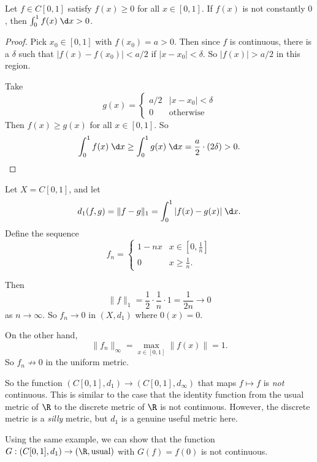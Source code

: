 \documentclass[a4paper]{article}
\begin{document}
\begin{lemma}
  Let $f\in C[0, 1]$ satisfy $f(x) \geq 0$ for all $x\in [0, 1]$. If $f(x)$ is not constantly $0$, then $\int_0^1 f(x)\;\d x > 0$.
\end{lemma}

\begin{proof}
  Pick $x_0 \in [0, 1]$ with $f(x_0) = a > 0$. Then since $f$ is continuous, there is a $\delta$ such that $|f(x) - f(x_0)| < a/2$ if $|x - x_0| < \delta$. So $|f(x)| > a/2$ in this region.

  Take
  \[
    g(x) =
    \begin{cases}
      a/2 & |x - x_0| < \delta\\
      0 & \text{otherwise}
    \end{cases}
  \]
  Then $f(x) \geq g(x)$ for all $x\in [0, 1]$. So
  \[
    \int_0^1 f(x)\;\d x \geq \int_0^1 g(x)\;\d x = \frac{a}{2}\cdot (2\delta) > 0.\qedhere
  \]
\end{proof}

\begin{eg}
  Let $X = C[0, 1]$, and let
  \[
    d_1(f, g) = \|f - g\|_1 = \int_0^1 |f(x) - g(x)|\;\d x.
  \]
  Define the sequence
  \[
    f_n =
    \begin{cases}
      1 - nx & x \in [0, \frac{1}{n}]\\
      0 & x \geq \frac{1}{n}.
    \end{cases}
  \]
  \begin{center}
  \end{center}
  Then
  \[
    \|f\|_1 = \frac{1}{2}\cdot \frac{1}{n} \cdot 1 = \frac{1}{2n} \to 0
  \]
  as $n \to \infty$. So $f_n \to 0$ in $(X, d_1)$ where $0(x) = 0$.

  On the other hand,
  \[
    \|f_n\|_\infty = \max_{x\in [0, 1]} \|f(x)\| = 1.
  \]
  So $f_n \not\to 0$ in the uniform metric.

  So the function $(C[0, 1], d_1) \to (C[0, 1], d_\infty)$ that maps $f\mapsto f$ is \emph{not} continuous. This is similar to the case that the identity function from the usual metric of $\R$ to the discrete metric of $\R$ is not continuous. However, the discrete metric is a \emph{silly} metric, but $d_1 $ is a genuine useful metric here.

  Using the same example, we can show that the function $G: (C[0, 1], d_1) \to (\R, \text{usual})$ with $G(f) = f(0)$ is not continuous.
\end{eg}
\end{document}
